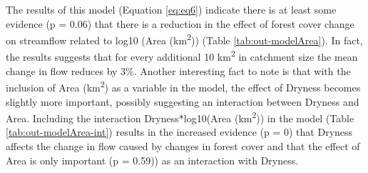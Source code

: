 \documentclass[]{elsarticle} %
\begin{document}
The results of this model (Equation \eqref{eq:eq6}) indicate there is at least some evidence (p = 0.06) that there is a reduction in the effect of forest cover change on streamflow related to log10 (Area (km\textsuperscript{2})) (Table \ref{tab:out-modelArea}). In fact, the results suggests that for every additional 10 km\textsuperscript{2} in catchment size the mean change in flow reduces by 3\%. Another interesting fact to note is that with the inclusion of Area (km\textsuperscript{2}) as a variable in the model, the effect of Dryness becomes slightly more important, possibly suggesting an interaction between Dryness and Area. Including the interaction Dryness*log10(Area (km\textsuperscript{2})) in the model (Table \ref{tab:out-modelArea-int}) results in the increased evidence (p = 0) that Dryness affects the change in flow caused by changes in forest cover and that the effect of Area is only important (p = 0.59)) as an interaction with Dryness.
\end{document}
